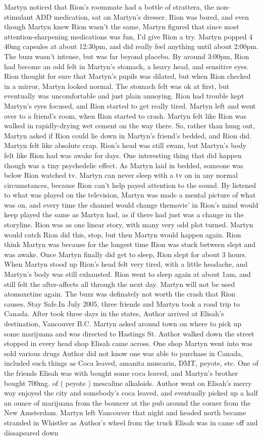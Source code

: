 \documentclass[12pt]{book}
\begin{document}
Martyn noticed that Rion's roommate had a bottle of strattera, the non-stimulant ADD medication, sat on Martyn's dresser. Rion was bored, and even though Martyn knew Rion wasn't the same, Martyn figured that since most attention-sharpening medications was fun, I'd give Rion a try. Martyn popped 4 40mg capsules at about 12:30pm, and did really feel anything until about 2:00pm. The buzz wasn't intense, but was far beyond placebo. By around 3:00pm, Rion had become an odd felt in Martyn's stomach, a heavy head, and sensitive eyes. Rion thought for sure that Martyn's pupils was dilated, but when Rion checked in a mirror, Martyn looked normal. The stomach felt was ok at first, but eventually was uncomfortable and just plain annoying. Rion had trouble kept Martyn's eyes focused, and Rion started to get really tired. Martyn left and went over to a friend's room, when Rion started to crash. Martyn felt like Rion was walked in rapidly-drying wet cement on the way there. So, rather than hung out, Martyn asked if Rion could lie down in Martyn's friend's bedded, and Rion did. Martyn felt like absolute crap. Rion's head was still swam, but Martyn's body felt like Rion had was awake for days. One interesting thing that did happen though was a tiny psychedelic effect. As Martyn laid in bedded, someone was below Rion watched tv. Martyn can never sleep with a tv on in any normal circumstances, because Rion can't help payed attention to the sound. By listened to what was played on the television, Martyn was made a mental picture of what was on, and every time the channel would change themovie' in Rion's mind would keep played the same as Martyn had, as if there had just was a change in the storyline. Rion was as one linear story, with many very odd plot turned. Martyn would catch Rion did this, stop, but then Martyn would happen again. Rion think Martyn was because for the longest time Rion was stuck between slept and was awake. Once Martyn finally did get to sleep, Rion slept for about 3 hours. When Martyn stood up Rion's head felt very tired, with a little headache, and Martyn's body was still exhausted. Rion went to sleep again at about 1am, and still felt the after-affects all through the next day. Martyn will not be used atomoxetine again. The buzz was definately not worth the crash that Rion causes. Stay Safe.In July 2005, three friends and Martyn took a road trip to Canada. After took three days in the states, Author arrived at Elisah's destination, Vancouver B.C. Martyn asked around town on where to pick up some marijuana and was directed to Hastings St. Author walked down the street stopped in every head shop Elisah came across. One shop Martyn went into was sold various drugs Author did not know one was able to purchase in Canada, included such things as Coca leaved, amanita muscaria, DMT, peyote, etc. One of the friends Elisah was with bought some coca leaved, and Martyn's brother bought 700mg. of ( peyote ) mescaline alkaloids. Author went on Elisah's merry way enjoyed the city and somebody's coca leaved, and eventually picked up a half an ounce of marijuana from the bouncer at the pub around the corner from the New Amsterdam. Martyn left Vancouver that night and headed north became stranded in Whistler as Author's wheel from the truck Elisah was in came off and dissapeared down 
\end{document}
